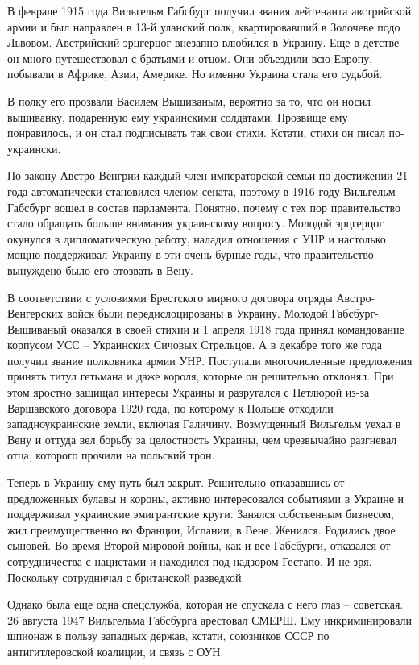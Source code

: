 В феврале 1915 года Вильгельм Габсбург получил звания лейтенанта австрийской
армии и был направлен в 13-й уланский полк, квартировавший в Золочеве подо
Львовом. Австрийский эрцгерцог внезапно влюбился в Украину. Еще в детстве он
много путешествовал с братьями и отцом. Они объездили всю Европу, побывали в
Африке, Азии, Америке. Но именно Украина стала его судьбой. 

В полку его прозвали Василем Вышиваным, вероятно за то, что он носил вышиванку,
подаренную ему украинскими солдатами. Прозвище ему понравилось, и он стал
подписывать так свои стихи. Кстати, стихи он писал по-украински. 

По закону Австро-Венгрии каждый член императорской семьи по достижении 21 года
автоматически становился членом сената, поэтому в 1916 году Вильгельм Габсбург
вошел в состав парламента. Понятно, почему с тех пор правительство стало
обращать больше внимания украинскому вопросу. Молодой эрцгерцог окунулся в
дипломатическую работу, наладил отношения с УНР и настолько мощно поддерживал
Украину в эти очень бурные годы, что правительство вынуждено было его отозвать
в Вену. 

В соответствии с условиями Брестского мирного договора отряды Австро-Венгерских
войск были передислоцированы в Украину. Молодой Габсбург- Вышиваный оказался в
своей стихии и 1 апреля 1918 года принял командование корпусом УСС – Украинских
Сичовых Стрельцов. А в декабре того же года получил звание полковника армии
УНР. Поступали многочисленные предложения принять титул гетьмана и даже короля,
которые он решительно отклонял. При этом яростно защищал интересы Украины и
разругался с Петлюрой из-за Варшавского договора 1920 года, по которому к
Польше отходили западноукраинские земли, включая Галичину. Возмущенный
Вильгельм уехал в Вену и оттуда вел борьбу за целостность Украины, чем
чрезвычайно разгневал отца, которого прочили на польский трон.

Теперь в Украину ему путь был закрыт. Решительно отказавшись от предложенных
булавы и короны, активно интересовался событиями в Украине и поддерживал
украинские эмигрантские круги. Занялся собственным бизнесом, жил
преимущественно во Франции, Испании, в Вене. Женился. Родились двое сыновей. Во
время Второй мировой войны, как и все Габсбурги, отказался от сотрудничества с
нацистами и находился под надзором Гестапо. И не зря. Поскольку сотрудничал с
британской разведкой.  

Однако была еще одна спецслужба, которая не спускала с него глаз – советская.
26 августа 1947 Вильгельма Габсбурга арестовал СМЕРШ. Ему инкриминировали
шпионаж в пользу западных держав, кстати, союзников СССР по антигитлеровской
коалиции, и связь с ОУН.

